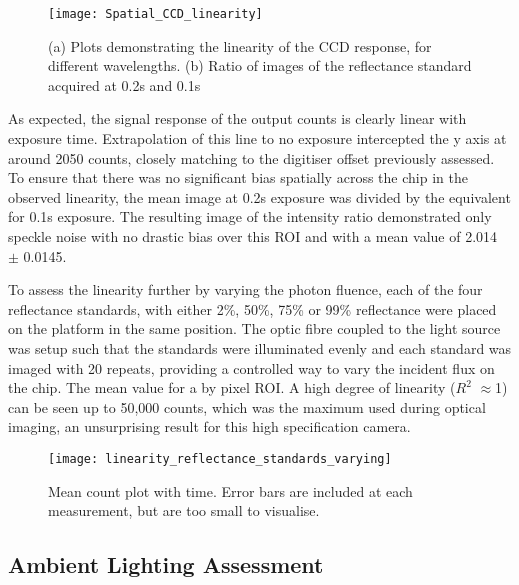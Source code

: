 \documentclass[twoside]{bhamthesis}
\theoremstyle{definition}
\begin{document}
\begin{figure}[!ht]
\centering
\texttt{[image: Spatial\_CCD\_linearity]}
\caption{(a) Plots demonstrating the linearity of the CCD response, for different wavelengths. (b) Ratio of images of the reflectance standard acquired at 0.2s and 0.1s }
\label{fig:test1}
\end{figure}

As expected, the signal response of the output counts is clearly linear with exposure time. Extrapolation of this line to no exposure intercepted the y axis at around 2050 counts, closely matching to the digitiser offset previously assessed. To ensure that there was no significant bias spatially across the chip in the observed linearity, the mean image at 0.2s exposure was divided by the equivalent for 0.1s exposure. The resulting image of the intensity ratio demonstrated only speckle noise with no drastic bias over this ROI and with a mean value of 2.014 $\pm$ 0.0145.

To assess the linearity further by varying the photon fluence, each of the four reflectance standards, with either 2\%, 50\%, 75\% or 99\% reflectance were placed on the platform in the same position. The optic fibre coupled to the light source was setup such that the standards were illuminated evenly and each standard was imaged with 20 repeats, providing a controlled way to vary the incident flux on the chip. The mean value for a by  pixel ROI. A high degree of linearity ($R^2$ $\approx$1) can be seen up to 50,000 counts, which was the maximum used during optical imaging, an unsurprising result for this high specification camera.

\begin{figure}[!ht]
\centering
\texttt{[image: linearity\_reflectance\_standards\_varying]}
\caption{Mean count plot with time. Error bars are included at each measurement, but are too small to visualise.}
\label{fig:linearity_reflectance_standards_varying}
\end{figure}

\subsection{Ambient Lighting Assessment}
\label{fig:ambient_lighting_tests}
\end{document}
